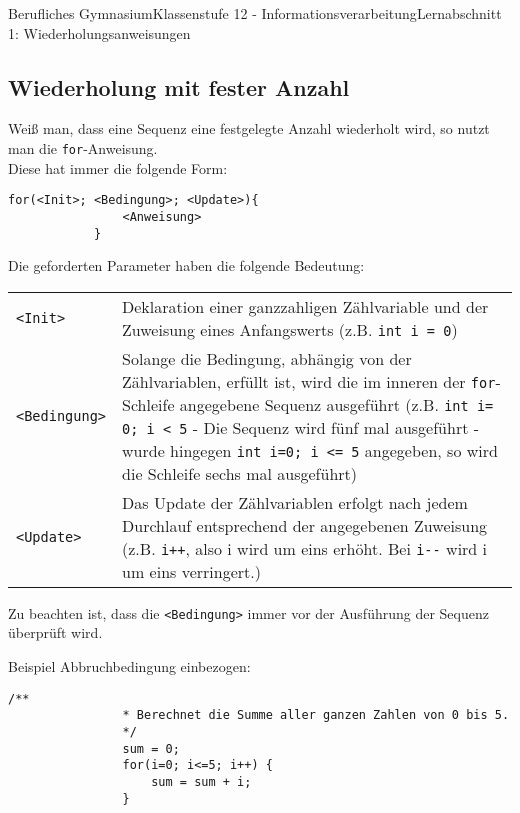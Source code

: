 \documentclass[11pt,oneside,openany,headings=optiontotoc,11pt,numbers=noenddot]{article}
\begin{document}
\begin{worksheet}{Berufliches Gymnasium}{Klassenstufe 12 - Informationsverarbeitung}{Lernabschnitt 1: Wiederholungsanweisungen}
		\subsection{Wiederholung mit fester Anzahl}
		Weiß man, dass eine Sequenz eine festgelegte Anzahl wiederholt wird, so nutzt man die \lstinline[style=JavaInputStyle]|for|-Anweisung.\\
		Diese hat immer die folgende Form:
		\begin{lstlisting}[style=JavaInputStyle]
			for(<Init>; <Bedingung>; <Update>){
				<Anweisung>
			}
		\end{lstlisting}
		\par\bigskip\noindent
		Die geforderten Parameter haben die folgende Bedeutung:\\
		\begin{tabularx}{\textwidth}{lX}
			{\lstinline[style=JavaInputStyle]|<Init>|} & Deklaration einer ganzzahligen Zählvariable und der Zuweisung eines Anfangswerts (z.B. {\lstinline[style=JavaInputStyle]|int i = 0|})\\
			{\lstinline[style=JavaInputStyle]|<Bedingung>|} & Solange die Bedingung, abhängig von der Zählvariablen, erfüllt ist, wird die im inneren der {\lstinline[style=JavaInputStyle]{for}}-Schleife angegebene Sequenz ausgeführt (z.B. {\lstinline[style=JavaInputStyle]|int i= 0; i < 5|} - Die Sequenz wird fünf mal ausgeführt - wurde hingegen {\lstinline[style=JavaInputStyle]|int i=0; i <= 5|} angegeben, so wird die Schleife sechs mal ausgeführt)\\
			{\lstinline[style=JavaInputStyle]|<Update>|} & Das Update der Zählvariablen erfolgt nach jedem Durchlauf entsprechend der angegebenen Zuweisung (z.B. {\lstinline[style=JavaInputStyle]|i++|}, also i wird um eins erhöht. Bei {\lstinline[style=JavaInputStyle]|i--|} wird i um eins verringert.)
		\end{tabularx}
		Zu beachten ist, dass die {\lstinline[style=JavaInputStyle]|<Bedingung>|} immer vor der Ausführung der Sequenz überprüft wird.\\
		\par\noindent
		\begin{minipage}[t]{0.48\textwidth}
			\vspace*{0pt}
			Beispiel Abbruchbedingung einbezogen:
			\begin{lstlisting}[style=JavaInputStyle,frame=single]
				/**
				* Berechnet die Summe aller ganzen Zahlen von 0 bis 5.
				*/
				sum = 0;
				for(i=0; i<=5; i++) {
					sum = sum + i;
				}
			\end{lstlisting}

\end{minipage}
\end{worksheet}
\end{document}
